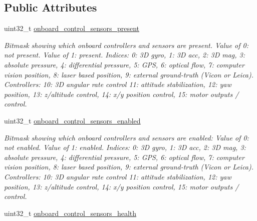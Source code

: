 \subsection*{Public Attributes}
\begin{DoxyCompactItemize}
\item 
\hypertarget{struct____mavlink__sys__status__t_a9c506f0a78266af5a1230eb1a0ca78b9}{uint32\+\_\+t \hyperlink{struct____mavlink__sys__status__t_a9c506f0a78266af5a1230eb1a0ca78b9}{onboard\+\_\+control\+\_\+sensors\+\_\+present}}\label{struct____mavlink__sys__status__t_a9c506f0a78266af5a1230eb1a0ca78b9}

\begin{DoxyCompactList}\small\item\em Bitmask showing which onboard controllers and sensors are present. Value of 0\+: not present. Value of 1\+: present. Indices\+: 0\+: 3\+D gyro, 1\+: 3\+D acc, 2\+: 3\+D mag, 3\+: absolute pressure, 4\+: differential pressure, 5\+: G\+P\+S, 6\+: optical flow, 7\+: computer vision position, 8\+: laser based position, 9\+: external ground-\/truth (Vicon or Leica). Controllers\+: 10\+: 3\+D angular rate control 11\+: attitude stabilization, 12\+: yaw position, 13\+: z/altitude control, 14\+: x/y position control, 15\+: motor outputs / control. \end{DoxyCompactList}\item 
\hypertarget{struct____mavlink__sys__status__t_ac7217643b5de2bd8fe861b0c9ff7277c}{uint32\+\_\+t \hyperlink{struct____mavlink__sys__status__t_ac7217643b5de2bd8fe861b0c9ff7277c}{onboard\+\_\+control\+\_\+sensors\+\_\+enabled}}\label{struct____mavlink__sys__status__t_ac7217643b5de2bd8fe861b0c9ff7277c}

\begin{DoxyCompactList}\small\item\em Bitmask showing which onboard controllers and sensors are enabled\+: Value of 0\+: not enabled. Value of 1\+: enabled. Indices\+: 0\+: 3\+D gyro, 1\+: 3\+D acc, 2\+: 3\+D mag, 3\+: absolute pressure, 4\+: differential pressure, 5\+: G\+P\+S, 6\+: optical flow, 7\+: computer vision position, 8\+: laser based position, 9\+: external ground-\/truth (Vicon or Leica). Controllers\+: 10\+: 3\+D angular rate control 11\+: attitude stabilization, 12\+: yaw position, 13\+: z/altitude control, 14\+: x/y position control, 15\+: motor outputs / control. \end{DoxyCompactList}\item 
\hypertarget{struct____mavlink__sys__status__t_a8527d9f9e9517ee5a9dc7aba0235ace9}{uint32\+\_\+t \hyperlink{struct____mavlink__sys__status__t_a8527d9f9e9517ee5a9dc7aba0235ace9}{onboard\+\_\+control\+\_\+sensors\+\_\+health}}\label{struct____mavlink__sys__status__t_a8527d9f9e9517ee5a9dc7aba0235ace9}


\end{DoxyCompactItemize}
